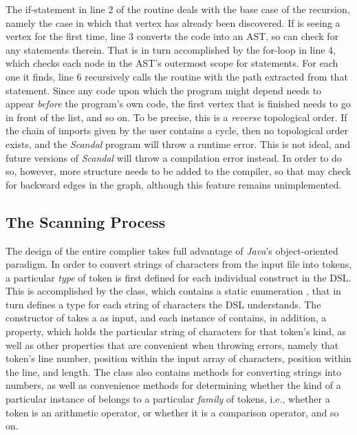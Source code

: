 The if-statement in line 2 of the  routine deals with the base case of the recursion, namely the case in which that vertex has already been discovered. If  is seeing a vertex for the first time, line 3 converts the code into an AST, so  can check for any  statements therein. That is in turn accomplished by the for-loop in line 4, which checks each node in the AST's outermost scope for  statements. For each one it finds, line 6 recursively calls the  routine with the path extracted from that  statement. Since any code upon which the program might depend needs to appear \emph{before} the program's own code, the first vertex that is finished needs to go in front of the list, and so on. To be precise, this is a \emph{reverse} topological order. If the chain of imports given by the user contains a cycle, then no topological order exists, and the \emph{Scandal} program will throw a runtime error. This is not ideal, and future versions of \emph{Scandal} will throw a compilation error instead. In order to do so, however, more structure needs to be added to the compiler, so that  may check for backward edges in the graph, although this feature remains unimplemented.

\subsection{The Scanning Process}

The design of the entire complier takes full advantage of \emph{Java}'s object-oriented paradigm. In order to convert strings of characters from the input file into tokens, a particular \emph{type} of token is first defined for each individual construct in the DSL. This is accomplished by the  class, which contains a static enumeration , that in turn defines a type for each string of characters the DSL understands. The constructor of  takes a  as input, and each instance of  contains, in addition, a  property, which holds the particular string of characters for that token's kind, as well as other properties that are convenient when throwing errors, namely that token's line number, position within the input array of characters, position within the line, and length. The  class also contains methods for converting strings into numbers, as well as convenience methods for determining whether the kind of a particular instance of  belongs to a particular \emph{family} of tokens, i.e., whether a token is an arithmetic operator, or whether it is a comparison operator, and so on.

